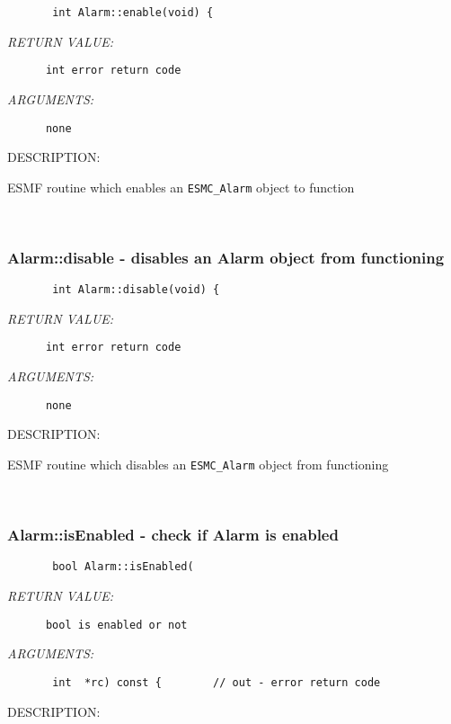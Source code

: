   
\begin{verbatim}       int Alarm::enable(void) {\end{verbatim}{\em RETURN VALUE:}
\begin{verbatim}      int error return code\end{verbatim}{\em ARGUMENTS:}
\begin{verbatim}      none\end{verbatim}
{\sf DESCRIPTION:\\ }


        ESMF routine which enables an {\tt ESMC\_Alarm} object to function
   
 
\mbox{}\hrulefill\ 
 
\subsubsection [Alarm::disable] {Alarm::disable - disables an Alarm object from functioning}


  
\begin{verbatim}       int Alarm::disable(void) {\end{verbatim}{\em RETURN VALUE:}
\begin{verbatim}      int error return code\end{verbatim}{\em ARGUMENTS:}
\begin{verbatim}      none\end{verbatim}
{\sf DESCRIPTION:\\ }


        ESMF routine which disables an {\tt ESMC\_Alarm} object from functioning
   
 
\mbox{}\hrulefill\ 
 
\subsubsection [Alarm::isEnabled] {Alarm::isEnabled - check if Alarm is enabled}


  
\begin{verbatim}       bool Alarm::isEnabled(\end{verbatim}{\em RETURN VALUE:}
\begin{verbatim}      bool is enabled or not\end{verbatim}{\em ARGUMENTS:}
\begin{verbatim}       int  *rc) const {        // out - error return code\end{verbatim}
{\sf DESCRIPTION:\\ }


